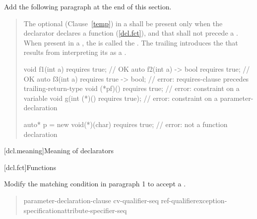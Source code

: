 Add the following paragraph at the end of this section.

\begin{quote}
\begin{addedblock}
\pnum
The optional  (Clause~\ref{temp}) in a 
 shall be present only when the declarator declares a 
function (\ref{dcl.fct}), and that  shall not 
precede a . 
% 
When present in a , the  
is called the .
The trailing  introduces the
 that results from interpreting
its  as a
.
% 
\enterexample
\begin{codeblock}
void f1(int a) requires true;         // OK
auto f2(int a) -> bool requires true; // OK
auto f3(int a) requires true -> bool; // error: requires-clause precedes trailing-return-type
void (*pf)() requires true;           // error: constraint on a variable
void g(int (*)() requires true);      // error: constraint on a parameter-declaration
  
auto* p = new void(*)(char) requires true; // error: not a function declaration
\end{codeblock}
\exitexample
\end{addedblock}
\end{quote}


\setcounter{section}{2}
[dcl.meaning]{Meaning of declarators}


\setcounter{subsection}{4}
[dcl.fct]{Functions}

Modify the matching condition in paragraph 1 to accept a 
.
      
\begin{quote}
\pnum\vspace{-\the\baselineskip} %

\begin{bnf}
 \terminal{(} parameter-declaration-clause \terminal{)} cv-qualifier-seq\opt\br
  \hspace*{\bnfindentinc}ref-qualifier\opt exception-specification\opt attribute-specifier-seq\opt {}
\end{bnf}
\end{quote}

